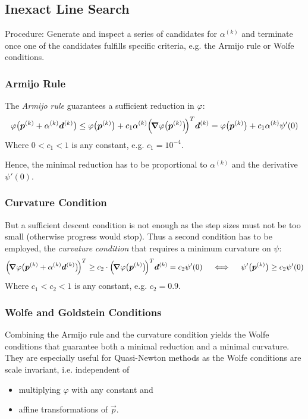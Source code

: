 		\subsection{Inexact Line Search}
			Procedure: Generate and inspect a series of candidates for \(\alpha^{(k)}\) and terminate once one of the candidates fulfills specific criteria, e.g. the Armijo rule or Wolfe conditions.

			\subsubsection{Armijo Rule}
				The \emph{Armijo rule} guarantees a sufficient reduction in \(\varphi\):
				\begin{align*}
					\varphi\big(\bm{p}^{(k)} + \alpha^{(k)} \bm{d}^{(k)}\big) \leq \varphi\big(\bm{p}^{(k)}\big) + c_1 \alpha^{(k)} \Big(\! \grad{\varphi}\big(\bm{p}^{(k)}\big) \!\Big)^T \bm{d}^{(k)} = \varphi\big(\bm{p}^{(k)}\big) + c_1 \alpha^{(k)} \psi'(0)
				\end{align*}
				Where \( 0 < c_1 < 1 \) is any constant, e.g. \( c_1 = 10^{-4} \).

				Hence, the minimal reduction has to be proportional to \(\alpha^{(k)}\) and the derivative \( \psi'(0) \).

			\subsubsection{Curvature Condition}
				But a sufficient descent condition is not enough as the step sizes must not be too small (otherwise progress would stop). Thus a second condition has to be employed, the \emph{curvature condition} that requires a minimum curvature on \(\psi\):
				\begin{align*}
					\Big(\!\grad{\varphi}\big(\bm{p}^{(k)} + \alpha^{(k)} \bm{d}^{(k)}\big)\!\Big)^T \geq c_2 \cdot \Big(\! \grad{\varphi}\big(\bm{p}^{(k)}\big) \!\Big)^T \bm{d}^{(k)} = c_2 \psi'(0) \quad\iff\quad \psi'\big(\bm{p}^{(k)}\big) \geq c_2 \psi'(0)
				\end{align*}
				Where \( c_1 < c_2 < 1 \) is any constant, e.g. \( c_2 = 0.9 \).

			\subsubsection{Wolfe and Goldstein Conditions}
				Combining the Armijo rule and the curvature condition yields the Wolfe conditions that guarantee both a minimal reduction and a minimal curvature. They are especially useful for Quasi-Newton methods as the Wolfe conditions are scale invariant, i.e. independent of
				\begin{itemize}
					\item multiplying \(\varphi\) with any constant and
					\item affine transformations of \(\vec{p}\).
				\end{itemize}

